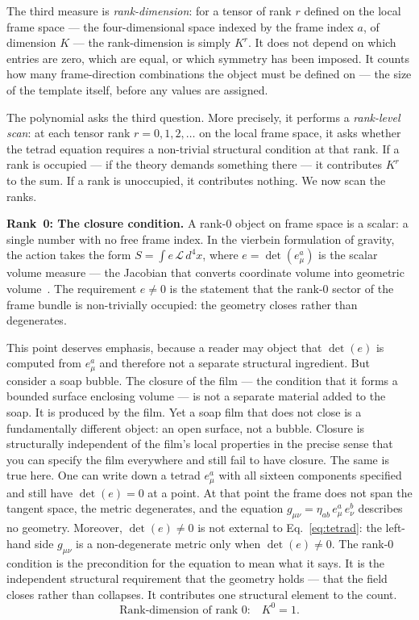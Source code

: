 \documentclass[a4paper,11pt]{article}
\begin{document}
The third measure is \emph{rank-dimension}: for a tensor
of rank $r$ defined on the local frame space --- the
four-dimensional space indexed by the frame index $a$,
of dimension $K$ --- the rank-dimension is simply $K^r$. It does not depend on
which entries are zero, which are equal, or which symmetry
has been imposed. It counts how many frame-direction
combinations the object must be defined on --- the size
of the template itself, before any values are assigned.

The polynomial asks the third question. More precisely,
it performs a \emph{rank-level scan}: at each tensor rank
$r = 0, 1, 2, \ldots$ on the local frame space, it asks
whether the tetrad equation requires a non-trivial
structural condition at that rank. If a rank is occupied
--- if the theory demands something there --- it
contributes $K^r$ to the sum. If a rank is unoccupied,
it contributes nothing. We now scan the ranks.

\textbf{Rank~0: The closure condition.}
A rank-0 object on frame space is a scalar: a single
number with no free frame index. In the vierbein
formulation of gravity, the action takes the form
$S = \int e\,\mathcal{L}\,d^4x$, where
$e = \det(e^a_\mu)$ is the scalar volume measure --- the
Jacobian that converts coordinate volume into geometric
volume~\cite{Carroll,MTW}. The requirement $e \neq 0$
is the statement that the rank-0 sector of the frame
bundle is non-trivially occupied: the geometry closes
rather than degenerates.

This point deserves emphasis, because a reader may
object that $\det(e)$ is computed from $e^a_\mu$ and
therefore not a separate structural ingredient. But
consider a soap bubble. The closure of the film ---
the condition that it forms a bounded surface enclosing
volume --- is not a separate material added to the soap.
It is produced by the film. Yet a soap film that does
not close is a fundamentally different object: an open
surface, not a bubble. Closure is structurally
independent of the film's local properties in the
precise sense that you can specify the film everywhere
and still fail to have closure. The same is true here.
One can write down a tetrad $e^a_\mu$ with all sixteen
components specified and still have $\det(e) = 0$ at a
point. At that point the frame does not span the tangent
space, the metric degenerates, and the equation
$g_{\mu\nu} = \eta_{ab}\,e^a_\mu\,e^b_\nu$ describes
no geometry. Moreover, $\det(e) \neq 0$ is not external to
Eq.~\eqref{eq:tetrad}: the left-hand side $g_{\mu\nu}$ is
a non-degenerate metric only when $\det(e) \neq 0$. The
rank-0 condition is the precondition for the equation to
mean what it says. It is the independent structural
requirement that the geometry holds --- that the field
closes rather than collapses. It contributes one
structural element to the count.
\begin{equation*}
  \text{Rank-dimension of rank 0:}\quad K^0 = 1.
\end{equation*}
\end{document}
